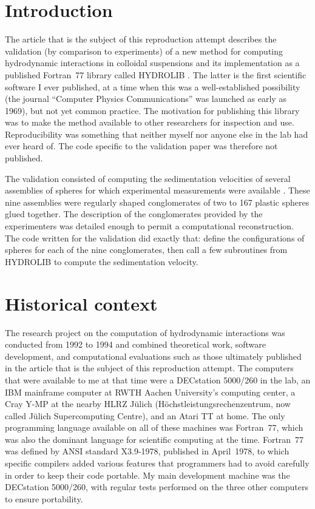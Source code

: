\section*{Introduction}

The article that is the subject of this reproduction attempt \cite{CichockiFrictionmobilitymany1994} describes the validation (by comparison to experiments) of a new method for computing hydrodynamic interactions in colloidal suspensions \cite{CichockiFrictionmobilitymany1994} and its implementation as a published Fortran~77 library called HYDROLIB \cite{HinsenHYDROLIBlibraryevaluation1995}. The latter is the first scientific software I ever published, at a time when this was a well-established possibility (the journal ``Computer Physics Communications'' was launched as early as 1969), but not yet common practice. The motivation for publishing this library was to make the method available to other researchers for inspection and use. Reproducibility was something that neither myself nor anyone else in the lab had ever heard of. The code specific to the validation paper was therefore not published.

The validation consisted of computing the sedimentation velocities of several assemblies of spheres for which experimental measurements were available \cite{LassoStokesdraghollow1986}. These nine assemblies were regularly shaped conglomerates of two to 167 plastic spheres glued together. The description of the conglomerates provided by the experimenters was detailed enough to permit a computational reconstruction. The code written for the validation did exactly that: define the configurations of spheres for each of the nine conglomerates, then call a few subroutines from HYDROLIB to compute the sedimentation velocity.

\section*{Historical context}

The research project on the computation of hydrodynamic interactions was conducted from 1992 to 1994 and combined theoretical work, software development, and computational evaluations such as those ultimately published in the article that is the subject of this reproduction attempt. The computers that were available to me at that time were a DECstation 5000/260 in the lab, an IBM mainframe computer at RWTH Aachen University's computing center, a Cray Y-MP at the nearby HLRZ Jülich (Höchstleistungsrechenzentrum, now called Jülich Supercomputing Centre), and an Atari TT at home. The only programming language available on all of these machines was Fortran~77, which was also the dominant language for scientific computing at the time. Fortran~77 was defined by ANSI standard X3.9-1978, published in April~1978, to which specific compilers added various features that programmers had to avoid carefully in order to keep their code portable. My main development machine was the DECstation 5000/260, with regular tests performed on the three other computers to ensure portability.

